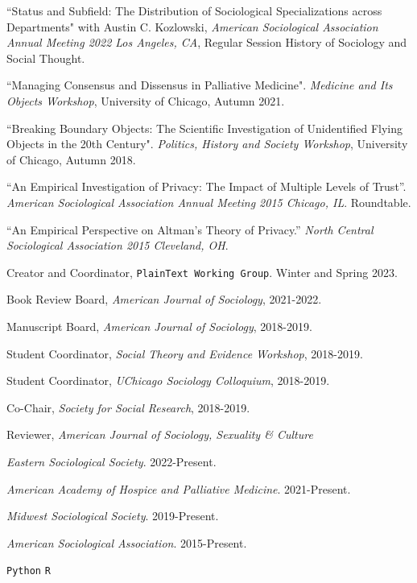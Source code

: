 \documentclass[11pt,article,oneside]{memoir}
\begin{document}
\ind ``Status and Subfield: The Distribution of Sociological Specializations across Departments" with Austin C. Kozlowski, \emph{American Sociological Association Annual Meeting 2022 Los Angeles, CA}, Regular Session History of Sociology and Social Thought. \vspace{0.05in} \newpage

\ind ``Managing Consensus and Dissensus in Palliative Medicine". \emph{Medicine and Its Objects Workshop}, University of Chicago, Autumn 2021. \vspace{0.05in}

\ind ``Breaking Boundary Objects: The Scientific Investigation of Unidentified Flying Objects in the 20th Century". \emph{Politics, History and Society Workshop}, University of Chicago,  Autumn 2018. \vspace{0.05in}

\ind ``An Empirical Investigation of Privacy: The Impact of Multiple Levels of Trust''. \emph{American Sociological Association Annual Meeting 2015 Chicago, IL}. Roundtable. \vspace{0.05in}

\ind ``An Empirical Perspective on Altman's Theory of Privacy.'' \emph{North Central Sociological Association 2015 Cleveland, OH}.

\normalsize

\medskip
{}
\medskip

\ind  Creator and Coordinator, \texttt{PlainText Working Group}. Winter and Spring 2023.

\ind Book Review Board, \emph{American Journal of Sociology}, 2021-2022.

\ind Manuscript Board, \emph{American Journal of Sociology}, 2018-2019.

\ind Student Coordinator, \emph{Social Theory and Evidence Workshop}, 2018-2019.

\ind Student Coordinator, \emph{UChicago Sociology Colloquium}, 2018-2019.

\ind Co-Chair, \emph{Society for Social Research}, 2018-2019.

\ind Reviewer, \emph{American Journal of Sociology, Sexuality \& Culture}

\medskip
{}
\medskip

\ind \emph{Eastern Sociological Society}. 2022-Present.

\ind \emph{American Academy of Hospice and Palliative Medicine}. 2021-Present.

\ind \emph{Midwest Sociological Society}. 2019-Present.

\ind \emph{American Sociological Association}. 2015-Present.

\medskip
{}
\medskip

\ind  \texttt{Python} \hspace{0.4in}  \texttt{R} \hspace{0.4in}
\end{document}
